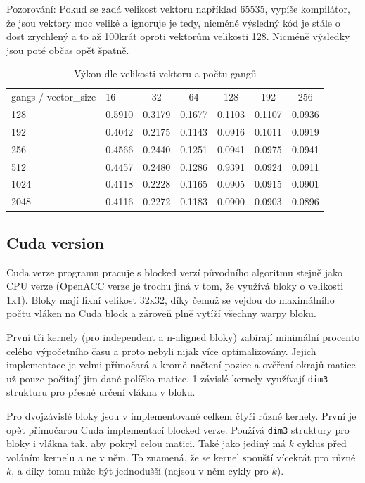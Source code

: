 \documentclass[11pt, fleqn]{article}
\begin{document}
Pozorování: Pokud se zadá velikost vektoru například 65535, vypíše kompilátor, že jsou vektory moc veliké a ignoruje je tedy, nicméně výsledný kód je stále o dost zrychlený a to až 100krát oproti vektorům velikosti 128. Nicméně výsledky jsou poté občas opět špatně. 

\begin{table}[tbp]
  \centering
  \caption{Výkon dle velikosti vektoru a počtu gangů}
  \label{fig:fw2}
  \def\arraystretch{2}
  \begin{tabular}{llccccc}
    gangs / vector\_size & 16 & 32 & 64 & 128 & 192 & 256 \\
    \rowcolor[HTML]{ECF4FF} 
    128  & 0.5910 & 0.3179 & 0.1677 & 0.1103 & 0.1107 & 0.0936 \\
    192  & 0.4042 & 0.2175 & 0.1143 & 0.0916 & 0.1011 & 0.0919 \\
    \rowcolor[HTML]{ECF4FF} 
    256  & 0.4566 & 0.2440 & 0.1251 & 0.0941 & 0.0975 & 0.0941 \\
    512  & 0.4457 & 0.2480 & 0.1286 & 0.9391 & 0.0924 & 0.0911 \\
    \rowcolor[HTML]{ECF4FF} 
    1024 & 0.4118 & 0.2228 & 0.1165 & 0.0905 & 0.0915 & 0.0901 \\
    2048 & 0.4116 & 0.2272 & 0.1183 & 0.0900 & 0.0903 & 0.0896
  \end{tabular}
\end{table}

\subsection{Cuda version}

Cuda verze programu pracuje s blocked verzí původního algoritmu stejně jako CPU verze (OpenACC verze je trochu jiná v tom, že využívá bloky o velikosti 1x1). Bloky mají fixní velikost 32x32, díky čemuž se vejdou do maximálního počtu vláken na Cuda block a zároveň plně vytíží všechny warpy bloku.

První tři kernely (pro independent a n-aligned bloky) zabírají minimální procento celého výpočetního času a proto nebyli nijak více optimalizovány. Jejich implementace je velmi přímočará a kromě načtení pozice a ověření okrajů matice už pouze počítají jim dané políčko matice. 1-závislé kernely využívají \lstinline{dim3} strukturu pro přesné určení vlákna v bloku.

Pro dvojzávislé bloky jsou v implementované celkem čtyři různé kernely. První je opět přímočarou Cuda implementací blocked verze. Používá \lstinline{dim3} struktury pro bloky i vlákna tak, aby pokryl celou matici. Také jako jediný má $k$ cyklus před voláním kernelu a ne v něm. To znamená, že se kernel spouští vícekrát pro různé $k$, a díky tomu může být jednodušší (nejsou v něm cykly pro $k$).
\end{document}
